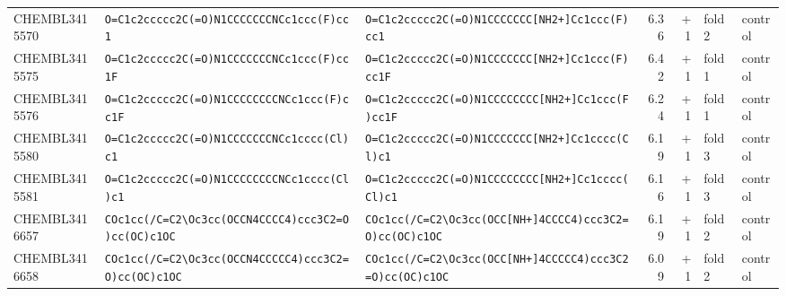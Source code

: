 \begin{longtable}{l p{4.4cm} p{4.4cm} r r l l}
CHEMBL3415570 & \texttt{O=\allowbreak{}C1c2ccccc2C(\allowbreak{}=\allowbreak{}O)\allowbreak{}N1CCCCCCCNCc1ccc(\allowbreak{}F)\allowbreak{}cc1} & \texttt{O=\allowbreak{}C1c2ccccc2C(\allowbreak{}=\allowbreak{}O)\allowbreak{}N1CCCCCCC[NH2+]\allowbreak{}Cc1ccc(\allowbreak{}F)\allowbreak{}cc1} & 6.36 & +1 & fold 2 & control \\
CHEMBL3415575 & \texttt{O=\allowbreak{}C1c2ccccc2C(\allowbreak{}=\allowbreak{}O)\allowbreak{}N1CCCCCCCNCc1ccc(\allowbreak{}F)\allowbreak{}cc1F} & \texttt{O=\allowbreak{}C1c2ccccc2C(\allowbreak{}=\allowbreak{}O)\allowbreak{}N1CCCCCCC[NH2+]\allowbreak{}Cc1ccc(\allowbreak{}F)\allowbreak{}cc1F} & 6.42 & +1 & fold 1 & control \\
CHEMBL3415576 & \texttt{O=\allowbreak{}C1c2ccccc2C(\allowbreak{}=\allowbreak{}O)\allowbreak{}N1CCCCCCCCNCc1ccc(\allowbreak{}F)\allowbreak{}cc1F} & \texttt{O=\allowbreak{}C1c2ccccc2C(\allowbreak{}=\allowbreak{}O)\allowbreak{}N1CCCCCCCC[NH2+]\allowbreak{}Cc1ccc(\allowbreak{}F)\allowbreak{}cc1F} & 6.24 & +1 & fold 1 & control \\
CHEMBL3415580 & \texttt{O=\allowbreak{}C1c2ccccc2C(\allowbreak{}=\allowbreak{}O)\allowbreak{}N1CCCCCCCNCc1cccc(\allowbreak{}Cl)\allowbreak{}c1} & \texttt{O=\allowbreak{}C1c2ccccc2C(\allowbreak{}=\allowbreak{}O)\allowbreak{}N1CCCCCCC[NH2+]\allowbreak{}Cc1cccc(\allowbreak{}Cl)\allowbreak{}c1} & 6.19 & +1 & fold 3 & control \\
CHEMBL3415581 & \texttt{O=\allowbreak{}C1c2ccccc2C(\allowbreak{}=\allowbreak{}O)\allowbreak{}N1CCCCCCCCNCc1cccc(\allowbreak{}Cl)\allowbreak{}c1} & \texttt{O=\allowbreak{}C1c2ccccc2C(\allowbreak{}=\allowbreak{}O)\allowbreak{}N1CCCCCCCC[NH2+]\allowbreak{}Cc1cccc(\allowbreak{}Cl)\allowbreak{}c1} & 6.16 & +1 & fold 3 & control \\
CHEMBL3416657 & \texttt{COc1cc(\allowbreak{}/\allowbreak{}C=\allowbreak{}C2\textbackslash{}Oc3cc(\allowbreak{}OCCN4CCCC4)\allowbreak{}ccc3C2=\allowbreak{}O)\allowbreak{}cc(\allowbreak{}OC)\allowbreak{}c1OC} & \texttt{COc1cc(\allowbreak{}/\allowbreak{}C=\allowbreak{}C2\textbackslash{}Oc3cc(\allowbreak{}OCC[NH+]\allowbreak{}4CCCC4)\allowbreak{}ccc3C2=\allowbreak{}O)\allowbreak{}cc(\allowbreak{}OC)\allowbreak{}c1OC} & 6.19 & +1 & fold 2 & control \\
CHEMBL3416658 & \texttt{COc1cc(\allowbreak{}/\allowbreak{}C=\allowbreak{}C2\textbackslash{}Oc3cc(\allowbreak{}OCCN4CCCCC4)\allowbreak{}ccc3C2=\allowbreak{}O)\allowbreak{}cc(\allowbreak{}OC)\allowbreak{}c1OC} & \texttt{COc1cc(\allowbreak{}/\allowbreak{}C=\allowbreak{}C2\textbackslash{}Oc3cc(\allowbreak{}OCC[NH+]\allowbreak{}4CCCCC4)\allowbreak{}ccc3C2=\allowbreak{}O)\allowbreak{}cc(\allowbreak{}OC)\allowbreak{}c1OC} & 6.09 & +1 & fold 2 & control \\

\end{longtable}
